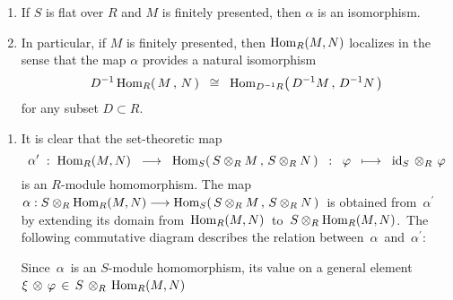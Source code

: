\begin{proposition}
\begin{enumerate}
\item
	If $S$ is flat over $R$ and $M$ is finitely presented, then $\alpha$ is an isomorphism.
\item
	In particular, if $M$ is finitely presented, then $\textnormal{Hom}_{R}(M, N)$ localizes in the
	sense that the map $\alpha$ provides a natural isomorphism
	\begin{equation*}
	D^{-1}\,\textnormal{Hom}_{R}\!\left(\,M\,,\,N\,\right)
	\;\;\cong\;\;
		\textnormal{Hom}_{D^{-1}R}\!\left(\,D^{-1}M\,,\,D^{-1}N\,\right)
	\end{equation*}
	for any subset $D \subset R$.
\end{enumerate}
\end{proposition}
\proof

\begin{enumerate}
\item
	It is clear that the set-theoretic map
	\begin{equation*}
	\alpha^{\prime} \;:\; \textnormal{Hom}_{R}(M,N)
		\;\; \longrightarrow \;\;
		\textnormal{Hom}_{S}\!\left(\, S \otimes_{R} M \,,\, S \otimes_{R} N \,\right)
	\;\;:\;\;
		\varphi \;\; \longmapsto \;\; \textnormal{id}_{S} \,\otimes_{R}\, \varphi
	\end{equation*}
	is an $R$-module homomorphism.
	The map
	\,$\alpha : S \otimes_{R} \textnormal{Hom}_{R}(M,N) \longrightarrow \textnormal{Hom}_{S}\!\left(\,S\otimes_{R}M\,,\,S\otimes_{R}N\,\right)$\,
	is obtained from \,$\alpha^{\prime}$\, by extending its domain from
	\,$\textnormal{Hom}_{R}(M,N)$\, to \,$S \otimes_{R} \textnormal{Hom}_{R}(M,N)$.\,
	The following commutative diagram describes the relation between \,$\alpha$\, and \,$\alpha^{\prime}$:\,
	\begin{center}
	\end{center}
	Since \,$\alpha$\, is an $S$-module homomorphism, its value on a general element
	\,$\xi \,\otimes\, \varphi \,\in\, S \,\otimes_{R}\, \textnormal{Hom}_{R}(M,N)$\,

\end{enumerate}
